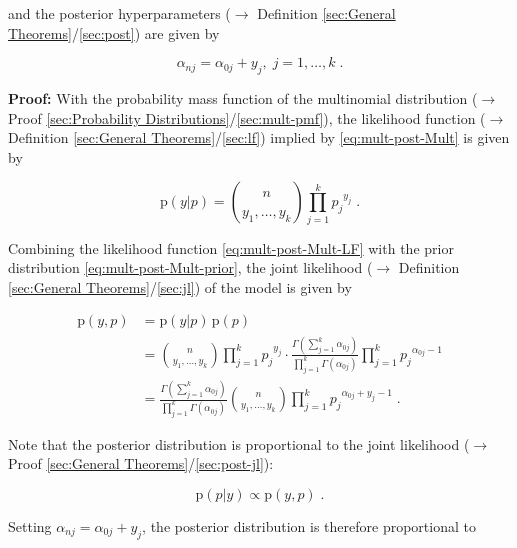 \documentclass[a4paper,12pt,twoside]{book}
\begin{document}
and the posterior hyperparameters ($\rightarrow$ Definition \ref{sec:General Theorems}/\ref{sec:post}) are given by

\begin{equation} \label{eq:mult-post-Mult-post-par}
\alpha_{nj} = \alpha_{0j} + y_j, \; j = 1,\ldots,k \; .
\end{equation}


\vspace{1em}
\textbf{Proof:} With the probability mass function of the multinomial distribution ($\rightarrow$ Proof \ref{sec:Probability Distributions}/\ref{sec:mult-pmf}), the likelihood function ($\rightarrow$ Definition \ref{sec:General Theorems}/\ref{sec:lf}) implied by \eqref{eq:mult-post-Mult} is given by

\begin{equation} \label{eq:mult-post-Mult-LF}
\mathrm{p}(y|p) = {n \choose {y_1, \ldots, y_k}} \prod_{j=1}^{k} {p_j}^{y_j} \; .
\end{equation}

Combining the likelihood function \eqref{eq:mult-post-Mult-LF} with the prior distribution \eqref{eq:mult-post-Mult-prior}, the joint likelihood ($\rightarrow$ Definition \ref{sec:General Theorems}/\ref{sec:jl}) of the model is given by

\begin{equation} \label{eq:mult-post-Mult-JL}
\begin{split}
\mathrm{p}(y,p) &= \mathrm{p}(y|p) \, \mathrm{p}(p) \\
&= {n \choose {y_1, \ldots, y_k}} \prod_{j=1}^{k} {p_j}^{y_j} \cdot \frac{\Gamma \left( \sum_{j=1}^{k} \alpha_{0j} \right)}{\prod_{j=1}^k \Gamma(\alpha_{0j})} \prod_{j=1}^{k} {p_j}^{\alpha_{0j}-1} \\
&= \frac{\Gamma \left( \sum_{j=1}^{k} \alpha_{0j} \right)}{\prod_{j=1}^k \Gamma(\alpha_{0j})} {n \choose {y_1, \ldots, y_k}} \prod_{j=1}^{k} {p_j}^{\alpha_{0j}+y_j-1} \; .
\end{split}
\end{equation}

Note that the posterior distribution is proportional to the joint likelihood ($\rightarrow$ Proof \ref{sec:General Theorems}/\ref{sec:post-jl}):

\begin{equation} \label{eq:mult-post-Mult-post-s1}
\mathrm{p}(p|y) \propto \mathrm{p}(y,p) \; .
\end{equation}

Setting $\alpha_{nj} = \alpha_{0j} + y_j$, the posterior distribution is therefore proportional to
\end{document}
